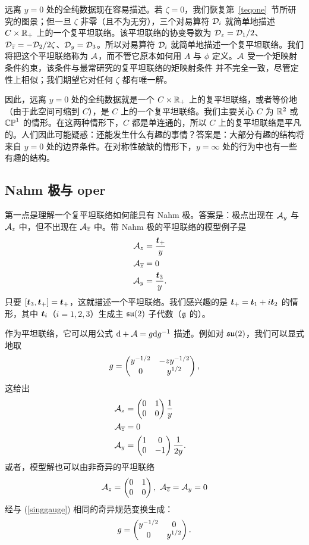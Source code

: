 远离 $y=0$ 处的全纯数据现在容易描述。若 $\zeta=0$，我们恢复第~\ref{teqone}~节所研究的图景；但一旦 $\zeta$ 非零（且不为无穷），三个对易算符 $\D_i$ 就简单地描述 $C\times \R_+$ 上的一个复平坦联络。该平坦联络的协变导数为 $\D_z=\D_1/2$、$\D_{\bar z}=-\D_2/2\zeta$、$\D_y=\D_3$。所以对易算符 $\D_i$ 就简单地描述一个复平坦联络。我们将把这个平坦联络称为 $\A$，而不管它原本如何用 $A$ 与 $\phi$ 定义。$\A$ 受一个矩映射条件约束，该条件与最常研究的复平坦联络的矩映射条件 \cite{Corlette} 并不完全一致，尽管定性上相似；我们期望它对任何 $\zeta$ 都有唯一解。

因此，远离 $y=0$ 处的全纯数据就是一个 $C\times\R_+$ 上的复平坦联络，或者等价地（由于此空间可缩到 $C$），是 $C$ 上的一个复平坦联络。我们主要关心 $C$ 为 $\R^2$ 或 $\Bbb{CP}^1$ 的情形。在这两种情形下，$C$ 都是单连通的，所以 $C$ 上的复平坦联络是平凡的。人们因此可能疑惑：还能发生什么有趣的事情？答案是：大部分有趣的结构将来自 $y=0$ 处的边界条件。在对称性破缺的情形下，$y=\infty$ 处的行为中也有一些有趣的结构。

\subsection{Nahm 极与 oper}\label{flatpole}

第一点是理解一个复平坦联络如何能具有 Nahm 极。答案是：极点出现在 $\A_y$ 与 $\A_z$ 中，但不出现在 $\A_{\bar z}$ 中。带 Nahm 极的平坦联络的模型例子是
\begin{align}\label{modsol}\A_z&=\frac{\ct_+}{y}\cr
\A_{\bar z} & = 0 \cr
\A_y & = \frac{\ct_3}{y}.   \end{align}
只要 $[\ct_3,\ct_+]=\ct_+$，这就描述一个平坦联络。我们感兴趣的是 $\ct_+=\ct_1+i\ct_2$ 的情形，其中 $\ct_i$（$i=1,2,3$）生成主 $\frak{su}(2)$ 子代数（$\frak g$ 的）。

作为平坦联络，它可以用公式 $\d+\A=g\d g^{-1}$ 描述。例如对 $\frak{su}(2)$，我们可以显式地取
\begin{equation}\label{inggauge}
g =\begin{pmatrix} y^{-1/2} & -zy^{-1/2} \cr 0 & y^{1/2} \end{pmatrix},
\end{equation}
这给出
\begin{align}\label{odsol} \A_z& = \begin{pmatrix}0&1\cr 0 & 0 \end{pmatrix}\frac{1}{y}\cr
                            \A_{\bar z}&=0 \cr
                            \A_y& = \begin{pmatrix}1 & 0 \cr 0 & -1\end{pmatrix}\frac{1}{2y}.\end{align}
或者，模型解也可以由非奇异的平坦联络
\begin{equation}\label{nodsol}\A_z=\begin{pmatrix}0 & 1\cr 0 & 0\end{pmatrix}, ~\A_{\bar z}=\A_y=0
\end{equation}
经与 (\ref{singgauge}) 相同的奇异规范变换生成：
\begin{equation}\label{winggauge}
g =\begin{pmatrix} y^{-1/2} & 0 \cr 0 & y^{1/2} \end{pmatrix}.
\end{equation}

